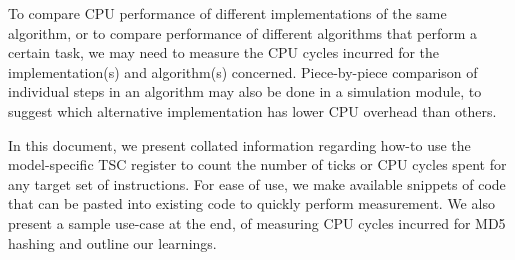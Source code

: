 To compare CPU performance of different implementations of the same algorithm, 
or to compare performance of different algorithms that perform a certain task, 
we may need to measure the CPU cycles incurred for the implementation(s)
and algorithm(s) concerned. Piece-by-piece comparison of individual steps
in an algorithm may also be done in a simulation module, to suggest which
alternative implementation has lower CPU overhead than others.

In this document, we present collated information regarding how-to use the
model-specific TSC register to count the number
of ticks or CPU cycles spent for any target set of instructions. For ease of 
use, we make available snippets of code that can be pasted into existing
code to quickly perform measurement. We also present a
sample use-case at the end, of measuring CPU cycles incurred for MD5 hashing
and outline our learnings.
